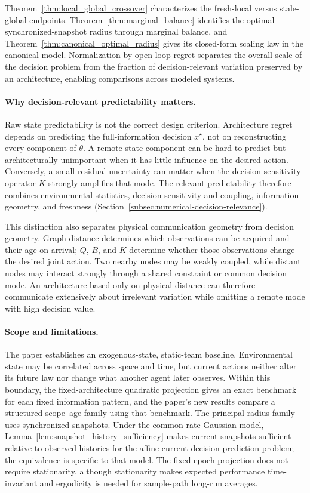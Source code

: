 \documentclass[11pt]{article}
\begin{document}
Theorem~\ref{thm:local_global_crossover} characterizes the fresh-local versus
stale-global endpoints. Theorem~\ref{thm:marginal_balance} identifies the
optimal synchronized-snapshot radius through marginal balance, and
Theorem~\ref{thm:canonical_optimal_radius} gives its closed-form scaling law in
the canonical model. Normalization by open-loop regret separates the overall
scale of the decision problem from the fraction of decision-relevant variation
preserved by an architecture, enabling comparisons across modeled systems.

\paragraph{Why decision-relevant predictability matters.}
Raw state predictability is not the correct design criterion. Architecture
regret depends on predicting the full-information decision $x^\star$, not on
reconstructing every component of $\theta$. A remote state component can be
hard to predict but architecturally unimportant when it has little influence on
the desired action. Conversely, a small residual uncertainty can matter when
the decision-sensitivity operator $K$ strongly amplifies that mode. The
relevant predictability therefore combines environmental statistics, decision
sensitivity and coupling, information geometry, and freshness
(Section~\ref{subsec:numerical-decision-relevance}).

This distinction also separates physical communication geometry from decision
geometry. Graph distance determines which observations can be acquired and
their age on arrival; $Q$, $B$, and $K$ determine whether those observations
change the desired joint action. Two nearby nodes may be weakly coupled, while
distant nodes may interact strongly through a shared constraint or common
decision mode. An architecture based only on physical distance can therefore
communicate extensively about irrelevant variation while omitting a remote
mode with high decision value.

\paragraph{Scope and limitations.}
The paper establishes an exogenous-state, static-team baseline. Environmental
state may be correlated across space and time, but current actions neither
alter its future law nor change what another agent later observes. Within this
boundary, the fixed-architecture quadratic projection gives an exact benchmark
for each fixed information pattern, and the paper's new results compare a
structured scope--age family using that benchmark. The principal radius family
uses synchronized snapshots. Under the common-rate Gaussian model,
Lemma~\ref{lem:snapshot_history_sufficiency} makes current snapshots sufficient
relative to observed histories for the affine current-decision prediction
problem; the equivalence is specific to that model. The fixed-epoch projection
does not require stationarity, although stationarity makes expected performance
time-invariant and ergodicity is needed for sample-path long-run averages.
\end{document}
